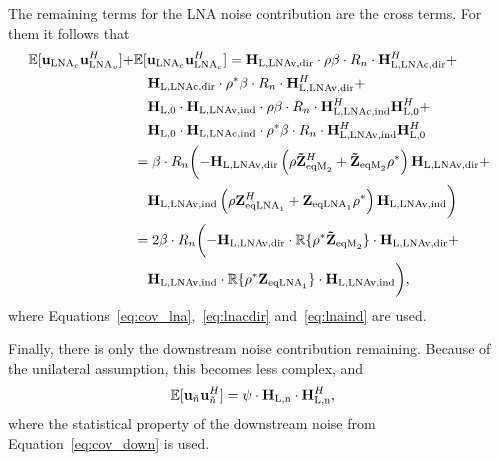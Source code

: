 The remaining terms for the LNA noise contribution are the cross terms.
For them it follows that
\begin{align}
\nonumber
\mathbb{E}[\mathbf{u}_{\text{LNA}_c}\mathbf{u}_{\text{LNA}_v}^H] +&
\mathbb{E}[\mathbf{u}_{\text{LNA}_c}\mathbf{u}_{\text{LNA}_c}^H] = 
	\mathbf{H}_\text{L,LNAv,dir} 
	\cdot\rho\beta \cdot R_n \cdot
	\mathbf{H}_\text{L,LNAc,dir}^H +\\\nonumber
&\quad	\mathbf{H}_\text{L,LNAc,dir} 
	\cdot\rho^*\beta \cdot R_n \cdot
	\mathbf{H}_\text{L,LNAv,dir}^H +\\\nonumber
&\quad	\mathbf{H}_\text{L,0}\cdot\mathbf{H}_\text{L,LNAv,ind} 
	\cdot\rho\beta \cdot R_n \cdot
	\mathbf{H}_\text{L,LNAc,ind}^H\mathbf{H}_\text{L,0}^H + \\\nonumber
&\quad	\mathbf{H}_\text{L,0}\cdot\mathbf{H}_\text{L,LNAc,ind} 
	\cdot\rho^*\beta \cdot R_n \cdot
	\mathbf{H}_\text{L,LNAv,ind}^H\mathbf{H}_\text{L,0}^H\\\nonumber
&= \beta \cdot R_n\biggl(
	-\mathbf{H}_\text{L,LNAv,dir} \left(\rho\mathbf{\tilde{Z}}_{\text{eqM}_2}^H+
	\mathbf{\tilde{Z}}_{\text{eqM}_2}\rho^*\right) \mathbf{H}_\text{L,LNAv,dir}+\\\nonumber
&\quad	\mathbf{H}_\text{L,LNAv,ind} \left(\rho\mathbf{Z}_{\text{eqLNA}_1}^H+
	\mathbf{Z}_{\text{eqLNA}_1}\rho^*\right) \mathbf{H}_\text{L,LNAv,ind}\biggr)\\\nonumber
&= 2\beta \cdot R_n\biggl(
	-\mathbf{H}_\text{L,LNAv,dir} \cdot\mathbb{R}\{\rho^*\mathbf{\tilde{Z}}_{\text{eqM}_2}\}\cdot
	\mathbf{H}_\text{L,LNAv,dir}+\\
&\quad	\mathbf{H}_\text{L,LNAv,ind} \cdot\mathbb{R}\{\rho^*\mathbf{Z}_{\text{eqLNA}_1}\}\cdot
	\mathbf{H}_\text{L,LNAv,ind}\biggr),
\end{align}
where Equations~\eqref{eq:cov_lna},~\eqref{eq:lnacdir} and~\eqref{eq:lnaind} are used.

Finally, there is only the downstream noise contribution remaining.
Because of the unilateral assumption, this becomes less complex, and
\begin{align}
\nonumber
\mathbb{E}[\mathbf{u}_{\tilde{n}}\mathbf{u}_{\tilde{n}}^H]&=
\psi\cdot\mathbf{H}_\text{L,n}\cdot\mathbf{H}_\text{L,n}^H,
\end{align}
where the statistical property of the downstream noise from Equation~\eqref{eq:cov_down} is used.

